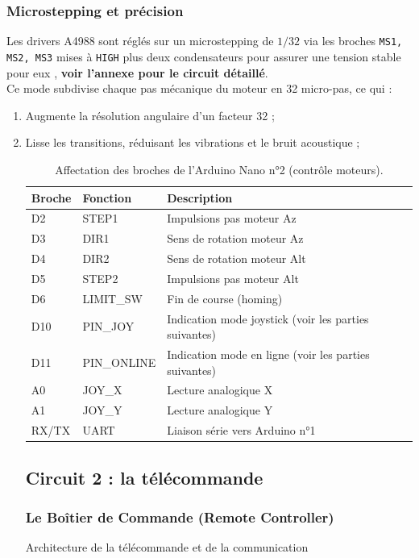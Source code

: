 \documentclass[12pt,a4paper]{report}
\begin{document}
\subsubsection{Microstepping et précision}
Les drivers A4988 sont réglés sur un microstepping de $1/32$ via les broches \texttt{MS1, MS2, MS3} mises à \texttt{HIGH} plus deux condensateurs pour assurer une tension stable pour eux , \textbf{voir l’annexe pour le circuit détaillé}.\\
 Ce mode subdivise chaque pas mécanique du moteur en 32 micro-pas, ce qui :
\begin{enumerate}
    \item Augmente la résolution angulaire d'un facteur 32 ;
    \item Lisse les transitions, réduisant les vibrations et le bruit acoustique ;
    
\begin{table}[H]
    \centering
    \caption{Affectation des broches de l'Arduino Nano n°2 (contrôle moteurs).}
    \begin{tabular}{|l|l|l|}
        \hline
        \textbf{Broche} & \textbf{Fonction} & \textbf{Description} \\
        \hline
        D2 & STEP1 & Impulsions pas moteur Az \\
        D3 & DIR1 & Sens de rotation moteur Az \\
        D4 & DIR2 & Sens de rotation moteur Alt \\
        D5 & STEP2 & Impulsions pas moteur Alt \\
        D6 & LIMIT\_SW & Fin de course (homing) \\
        D10 & PIN\_JOY & Indication mode joystick (voir les parties suivantes) \\
        D11 & PIN\_ONLINE & Indication mode en ligne (voir les parties suivantes) \\
        A0 & JOY\_X & Lecture analogique X \\
        A1 & JOY\_Y & Lecture analogique Y \\
        RX/TX & UART & Liaison série vers Arduino n°1 \\
        \hline
    \end{tabular}
\end{table}
\subsection{Circuit 2 : la télécommande}
\subsubsection{Le Boîtier de Commande (Remote Controller)}
Architecture de la télécommande et de la communication


\end{enumerate}
\end{document}
